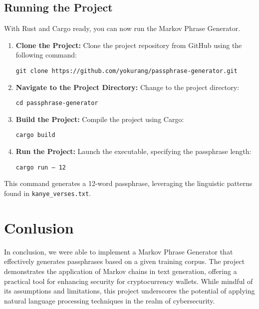 \documentclass[a4paper,12pt]{article}
\begin{document}
\subsection{Running the Project}

With Rust and Cargo ready, you can now run the Markov Phrase Generator.

\begin{enumerate}
    \item \textbf{Clone the Project:}
    Clone the project repository from GitHub using the following command:

    \texttt{git clone https://github.com/yokurang/passphrase-generator.git}

    \item \textbf{Navigate to the Project Directory:}
    Change to the project directory:

    \texttt{cd passphrase-generator}

    \item \textbf{Build the Project:}
    Compile the project using Cargo:
    
    \texttt{cargo build}

    \item \textbf{Run the Project:}
    Launch the executable, specifying the passphrase length:
    
    \texttt{cargo run -- 12}

\end{enumerate}

This command generates a 12-word passphrase, leveraging the linguistic patterns found in \texttt{kanye\_verses.txt}.


\section{Conlusion}

In conclusion, we were able to implement a Markov Phrase Generator that effectively generates passphrases based on a given training corpus. The project demonstrates the application of Markov chains in text generation, offering a practical tool for enhancing security for cryptocurrency wallets. While mindful of its assumptions and limitations, this project underscores the potential of applying natural language processing techniques in the realm of cybersecurity.
\end{document}
